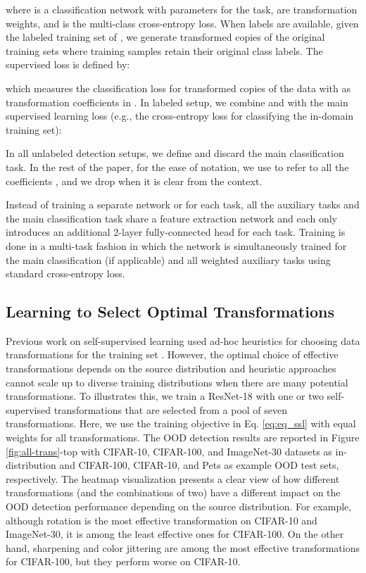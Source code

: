 \documentclass[letterpaper]{article} \usepackage{aaai22}  \usepackage{times}  \usepackage{helvet}  \usepackage{courier}  \usepackage[hyphens]{url}  \usepackage{graphicx} \urlstyle{rm} \def\UrlFont{\rm}  \usepackage{natbib}  \usepackage{caption} \DeclareCaptionStyle{ruled}{labelfont=normalfont,labelsep=colon,strut=off} \frenchspacing  \setlength{\pdfpagewidth}{8.5in}  \setlength{\pdfpageheight}{11in}
\begin{document}
where  is a classification network with parameters  for the  task,  are transformation weights, and  is the multi-class cross-entropy loss.
When labels are available, given the labeled training set of  , we generate transformed copies of the original training sets  where training samples retain their original class labels. 
The supervised loss  is defined by: 

which measures the classification loss for transformed copies of the data with  as transformation coefficients in .  In labeled setup, we combine  and  with the main supervised learning loss  (e.g., the cross-entropy loss for classifying the in-domain training set):

In all unlabeled detection setups, we define  and discard the main classification task. 
In the rest of the paper, for the ease of notation, we use  to refer to all the coefficients , and we drop  when it is clear from the context.  


Instead of training a separate network  or  for each task, all the auxiliary tasks and the main classification task share a feature extraction network and each only introduces an additional 2-layer fully-connected head for each task. Training is done in a multi-task fashion in which the network is simultaneously trained for the main classification (if applicable) and all weighted auxiliary tasks using standard cross-entropy loss. 


\subsection{Learning to Select Optimal Transformations} 
\label{sec:method-opt}
Previous work on self-supervised learning used ad-hoc heuristics for choosing data transformations for the training set \cite{Hendrycks2019sv,golan2018deep,tack2020csi}.
However, the optimal choice of effective transformations depends on the source distribution and heuristic approaches cannot scale up to diverse training distributions when there are many potential transformations. 
To illustrates this, we train a ResNet-18 \cite{he2016deep} with one or two self-supervised transformations that are selected from a pool of seven transformations. Here, we use the training objective in Eq. \ref{eq:eq_ssl} with equal weights for all transformations.
The OOD detection results are reported in Figure \ref{fig:all-trans}-top with CIFAR-10, CIFAR-100, and ImageNet-30 \cite{Hendrycks2019sv} datasets as in-distribution and CIFAR-100, CIFAR-10, and Pets \cite{parkhi2012cats} as example OOD test sets, respectively. The heatmap visualization presents a clear view of how different transformations (and the combinations of two) have a different impact on the OOD detection performance depending on the source distribution. 
For example, although rotation is the most effective transformation on CIFAR-10 and ImageNet-30, it is among the least effective ones for CIFAR-100. On the other hand, sharpening and color jittering are among the most effective transformations for CIFAR-100, but they perform worse on CIFAR-10. 
\end{document}

